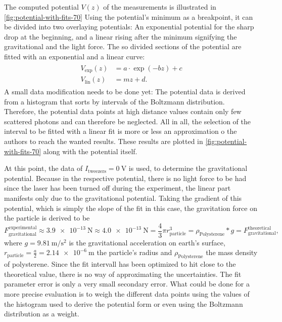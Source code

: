 \documentclass[../bericht.tex]{subfiles}
\begin{document}
      \medskip

      The computed potential $V(z)$ of the measurements is illustrated in \cref{fig:potential-with-fits-70} Using the potential's minimum as a breakpoint, it can be divided into two overlaying potentials: An exponential potential for the sharp drop at the beginning, and a linear rising after the minimum signifying the gravitational and the light force. The so divided sections of the potential are fitted with an exponential and a linear curve:
      \begin{align}
        \begin{split}
          V_\mathrm{exp}(z) &= a\cdot \exp\left( -b z \right) + c \\
          V_\mathrm{lin}(z) &= mz+ d.
        \end{split}
        \label{eq:pot-fits}
      \end{align}
      A small data modification needs to be done yet: The potential data is derived from a histogram that sorts by intervals of the Boltzmann distribution. Therefore, the potential data points at high distance values contain only few scattered photons and can therefore be neglected. All in all, the selection of the interval to be fitted with a linear fit is more or less an approximation o the authors to reach the wanted results. These results are plotted in \cref{fig:potential-with-fits-70} along with the potential itself.

      At this point, the data of $I_\mathrm{tweezers}=\SI{0}{\volt}$ is used, to determine the gravitational potential. Because in the respective potential, there is no light force to be had since the laser has been turned off during the experiment, the linear part manifests only due to the gravitational potential. Taking the gradient of this potential, which is simply the slope of the fit in this case, the gravitation force on the particle is derived to be
      \begin{equation*}
        F_\mathrm{gravitational}^\mathrm{experimental}\approx\SI{3,9e-13}{\newton}\approx \SI{4,0e-13}{\newton}=\frac{4}{3}\pi r_\mathrm{particle}^3= \rho_\mathrm{Polysterene}*g=F_\mathrm{gravitational}^\mathrm{theoretical},
      \end{equation*}
      where $g=\SI{9,81}{\meter\per\square\second}$ is the gravitational acceleration on earth's surface, $r_\mathrm{particle}=\frac{a}{2}=\SI{2,14e-6}{\meter}$ the particle's radius and $\rho_\mathrm{Polysterene}$ the mass density of polysterene. Since the fit intervall has been optimized to hit close to the theoretical value, there is no way of approximating the uncertainties. The fit parameter error is only a very small secondary error. What could be done for a more precise evaluation is to weigh the different data points using the values of the histogram used to derive the potential form or even using the Boltzmann distribution as a weight.
      \medskip
\end{document}

